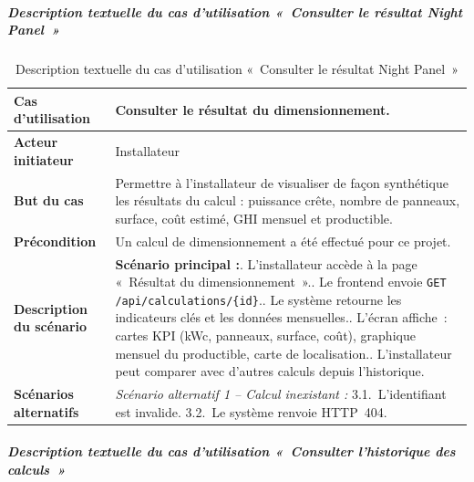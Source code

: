 \subparagraph{Description textuelle du cas d'utilisation «~Consulter le résultat Night Panel~»}

\begin{table}[H]
  \caption{Description textuelle du cas d'utilisation «~Consulter le résultat Night Panel~»}
  \label{tab:cu-resultat-np}
  \centering
  \begin{tabularx}{\textwidth}{|L{3.8cm}|X|}
    \hline
    \textbf{Cas d'utilisation} & Consulter le résultat du dimensionnement. \\
    \hline
    \textbf{Acteur initiateur} & Installateur \\
    \hline
    \textbf{But du cas} & Permettre à l'installateur de visualiser de façon synthétique les résultats du calcul : puissance crête, nombre de panneaux, surface, coût estimé, GHI mensuel et productible. \\
    \hline
    \textbf{Précondition} & Un calcul de dimensionnement a été effectué pour ce projet. \\
    \hline
    \textbf{Description du scénario} &
    \textbf{Scénario principal :}. L'installateur accède à la page «~Résultat du dimensionnement~».. Le frontend envoie \texttt{GET /api/calculations/\{id\}}.. Le système retourne les indicateurs clés et les données mensuelles.. L'écran affiche~: cartes KPI (kWc, panneaux, surface, coût), graphique mensuel du productible, carte de localisation.. L'installateur peut comparer avec d'autres calculs depuis l'historique.\\
    \hline
    \textbf{Scénarios alternatifs} &
    \textit{Scénario alternatif 1 -- Calcul inexistant :}\newline
    \hspace*{6pt}3.1.~L'identifiant est invalide.\newline
    \hspace*{6pt}3.2.~Le système renvoie HTTP~404.\\
    \hline
  \end{tabularx}
\end{table}

\subparagraph{Description textuelle du cas d'utilisation «~Consulter l'historique des calculs~»}

